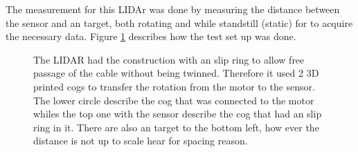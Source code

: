 The measurement for this LIDAr was done by measuring the distance between  the sensor and an target, both rotating and while standstill (static) for to acquire the necessary data. Figure \ref{fig:testSetUp} describes how the test set up was done.
%
\begin{figure}[ht]
    \centering
   
  \caption{The LIDAR had the construction with an slip ring to allow free passage of the cable without being twinned. Therefore it used 2 3D printed cogs to transfer the rotation from the motor to the sensor. The lower circle describe the cog that was connected to the motor whiles the top one with the sensor describe the cog that had an slip ring in it. There are also an target to the bottom left, how ever the distance is not up to scale hear for spacing reason.}
  \label{fig:testSetUp}
\end{figure}